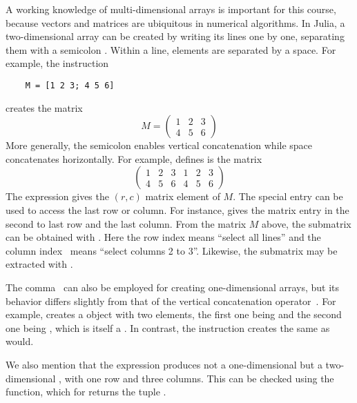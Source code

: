 A working knowledge of multi-dimensional arrays is important for this course,
because vectors and matrices are ubiquitous in numerical algorithms.
In Julia, a two-dimensional array can be created by writing its lines one by one,
separating them with a semicolon \julia{;}.
Within a line, elements are separated by a space.
For example,
the instruction
\begin{verbatim}
    M = [1 2 3; 4 5 6]
\end{verbatim}
creates the matrix
\[
    M =
    \begin{pmatrix}
        1 & 2 & 3 \\ 4 & 5 & 6
    \end{pmatrix}
\]
More generally,
the semicolon enables vertical concatenation
while space concatenates horizontally.
For example, \julia{[M M]} defines is the matrix
\[
    \begin{pmatrix}
        1 & 2 & 3 & 1 & 2 & 3 \\ 4 & 5 & 6 & 4 & 5 & 6
    \end{pmatrix}
\]
The expression  gives the $(r, c)$ matrix element of $M$.
The special entry  can be used to access the last row or column.
For instance,  gives the matrix entry in the second to last row and the last column.
From the matrix $M$ above,
the submatrix \julia{[2  3; 5 6]} can be obtained with .
Here the row index \julia{:} means ``select all lines'' and the column index~ means ``select columns 2 to 3''.
Likewise, the submatrix \julia{[1 3; 4 6]} may be extracted with .
\begin{remark}
    The comma~\julia{,} can also be employed for creating one-dimensional arrays,
    but its behavior differs slightly from that of the vertical concatenation operator~\julia{;}.
    For example,  creates a  object with two elements,
    the first one being  and the second one being \julia{[1; 3]}, which is itself a .
    In contrast, the instruction  creates the same  as \julia{[1; 2; 3]} would.

    We also mention that the expression  produces not a one-dimensional  but a two-dimensional ,
    with one row and three columns.
    This can be checked using the  function,
    which for  returns the tuple .
\end{remark}

